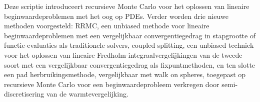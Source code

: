 Deze scriptie introduceert recursieve Monte Carlo voor het oplossen van
lineaire beginwaardeproblemen met het oog op PDEs.
Verder worden drie nieuwe methoden voorgesteld: RRMC, een unbiased methode
voor lineaire beginwaardeproblemen met een vergelijkbaar convergentiegedrag in
stapgrootte of functie-evaluaties als traditionele solvers, coupled splitting, een unbiased techniek
voor het oplossen van lineaire Fredholm-integraalvergelijkingen van de tweede soort met een vergelijkbaar
convergentiegedrag als fixpuntmethoden, en ten slotte een pad herbruikingsmethode,
vergelijkbaar met walk on spheres,
toegepast op recursieve Monte Carlo voor een
beginwaardeprobleem verkregen door semi-discretisering van de warmtevergelijking.